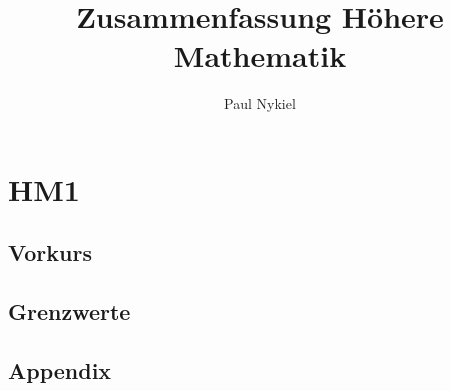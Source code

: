 \documentclass[10pt]{report}
\title{Zusammenfassung Höhere Mathematik}
\author{Paul Nykiel}
\begin{document}
    \maketitle
    \pagebreak
    \tableofcontents
    \pagebreak

    \part{HM1}
    \chapter{Vorkurs}
    

    \chapter{Grenzwerte}
    

    \pagebreak
    \chapter{Appendix}
\end{document}
